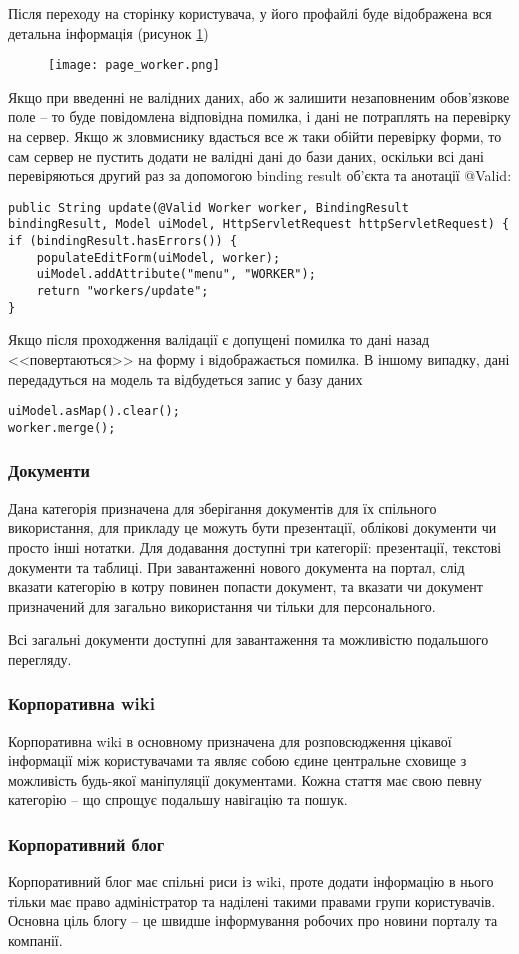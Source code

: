 \par Після переходу на сторінку користувача, у його профайлі буде відображена вся детальна інформація (рисунок \ref{pic:page_worker})
  \begin{figure}[!ht]
  \centering
      \texttt{[image: page\_worker.png]}
      \label{pic:page_worker}
  \end{figure}
\par Якщо при введенні не валідних даних, або ж залишити незаповненим обов'язкове поле -- то буде повідомлена відповідна помилка, і дані не потраплять на перевірку на сервер. Якщо ж зловмиснику вдасться все ж таки обійти перевірку форми, то сам сервер не пустить додати не валідні дані до бази даних, оскільки всі дані перевіряються другий раз за допомогою binding result об'єкта та анотації @Valid:
\begin{lstlisting}
public String update(@Valid Worker worker, BindingResult bindingResult, Model uiModel, HttpServletRequest httpServletRequest) {
if (bindingResult.hasErrors()) {
    populateEditForm(uiModel, worker);
    uiModel.addAttribute("menu", "WORKER");
    return "workers/update";
}
\end{lstlisting}
\par Якщо після проходження валідації є допущені помилка то дані назад <<повертаються>> на форму і відображається помилка. В іншому випадку, дані передадуться на модель та відбудеться запис у базу даних
\begin{lstlisting}
uiModel.asMap().clear();
worker.merge();
\end{lstlisting}


\subsubsection{Документи}
Дана категорія призначена для зберігання документів для їх спільного використання, для прикладу це можуть бути презентації, облікові документи чи просто інші нотатки. Для додавання доступні три категорії: презентації, текстові документи та таблиці. При завантаженні нового документа на портал, слід вказати категорію в котру повинен попасти документ, та вказати чи документ призначений для загально використання чи тільки для персонального.
\par Всі загальні документи доступні для завантаження та можливістю подальшого перегляду.

\subsubsection{Корпоративна wiki}
\par Корпоративна wiki в основному призначена для розповсюдження цікавої інформації між користувачами та являє собою єдине центральне сховище з можливість будь-якої маніпуляції документами. Кожна стаття має свою певну категорію -- що спрощує подальшу навігацію та пошук.

\subsubsection{Корпоративний блог}
\par Корпоративний блог має спільні риси із wiki, проте додати інформацію в нього тільки має право адміністратор та наділені такими правами групи користувачів. Основна ціль блогу -- це швидше інформування робочих про новини порталу та компанії.
